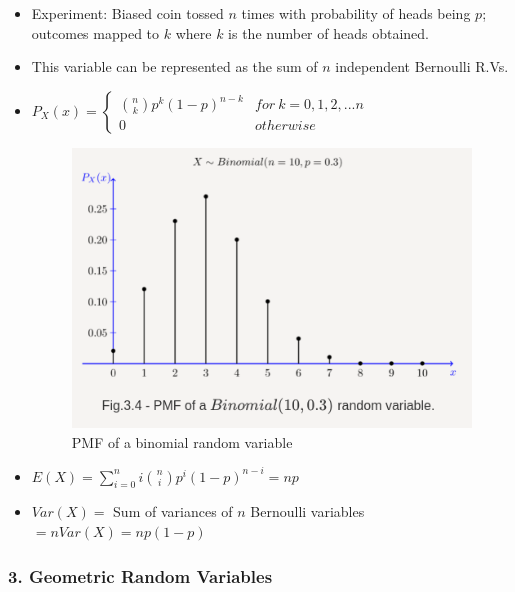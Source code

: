 \begin{itemize}
\item
  Experiment: Biased coin tossed \(n\) times with probability of heads
  being \(p\); outcomes mapped to \(k\) where \(k\) is the number of
  heads obtained.
\item
  This variable can be represented as the sum of \(n\) independent
  Bernoulli R.Vs.
\item
  \(P_X(x) = \begin{cases}{{n}\choose{k}} p^k(1-p)^{n-k} & for \ k=0, 1, 2, ... n\\0 & otherwise\end{cases}\)

  \begin{figure}[''h!'']
  \centering
  \includegraphics{Lecture 13 Notes e842fef9a3e0449fa78bac59b75dbc5c/Screenshot_from_2021-08-06_23-12-57.png}
  \caption{PMF of a binomial random variable}
  \end{figure}
\item
  \(E(X) = \displaystyle\sum_{i=0}^{n}i{n \choose i}p^i(1-p)^{n-i} = np\)
\item
  \(Var(X) =\) Sum of variances of \(n\) Bernoulli variables
  \(=nVar(X) = np(1-p)\)
\end{itemize}

\hypertarget{geometric-random-variables}{%
\subsubsection{3. Geometric Random
Variables}\label{geometric-random-variables}}

